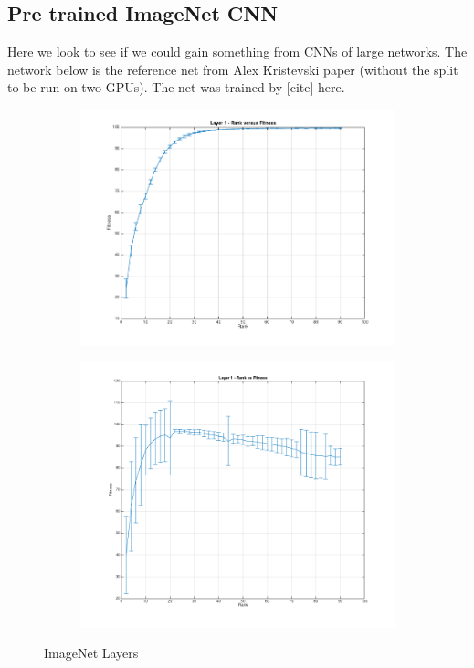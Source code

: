 
\subsection{Pre trained ImageNet CNN}
Here we look to see if we could gain something from CNNs of large networks. The network below is the reference net from Alex Kristevski paper (without the split to be run on two GPUs). The net was trained by [cite] here. 

\begin{figure}[h]
  \centering
  \begin{subfigure}[b]{0.40\textwidth}
   \includegraphics[width=\textwidth]{images/Layer1ImageNet.png}
    \caption{}
  \end{subfigure}
  \begin{subfigure}[b]{0.40\textwidth}
    \includegraphics[width=\textwidth]{images/Layer2ImageNet.png}
    \caption{}
  \end{subfigure}
  \caption{ImageNet Layers}
  \label{fig:user_stribution}
\end{figure}

